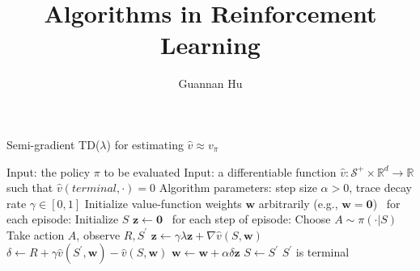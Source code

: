 \documentclass[12pt,a4paper]{article}
\begin{document}
\title{Algorithms in Reinforcement Learning}
\author{Guannan Hu}
\maketitle

\begin{algorithm}
\caption{Semi-gradient TD($\lambda$) for estimating $\hat{v} \approx v_{\pi}$}
\begin{algorithmic}
	\State Input: the policy $\pi$ to be evaluated
	\State Input: a differentiable function $\hat{v}: \mathcal{S}^{+} \times \mathbb{R}^{d} \rightarrow \mathbb{R}$ such that $\hat{v}(terminal, \cdot) = 0$
	\State Algorithm parameters: step size $\alpha > 0$, trace decay rate $\gamma \in [0, 1]$
	\State Initialize value-function weights $\mathbf{w}$ arbitrarily (e.g., $\mathbf{w} = \mathbf{0}$)
	\State
	\Loop\ for each episode:
		\State Initialize $S$
		\State $\mathbf{z} \leftarrow \mathbf{0}$
		\Repeat\ for each step of episode:
			\State Choose $A \sim \pi(\cdot|S)$
			\State Take action $A$, observe $R, S^{'}$
			\State $\mathbf{z} \leftarrow \gamma\lambda\mathbf{z} + \nabla\hat{v}(S,\mathbf{w})$
			\State $\delta \leftarrow R + \gamma\hat{v}(S^{'}, \mathbf{w}) - \hat{v}(S, \mathbf{w})$
			\State $\mathbf{w} \leftarrow \mathbf{w} + \alpha\delta\mathbf{z}$
			\State $S \leftarrow S^{'}$
		\Until $S^{'}$ is terminal
		
	\EndLoop
	
\end{algorithmic}
\end{algorithm}

\newpage
\end{document}
